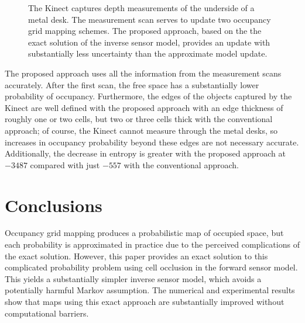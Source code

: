 \documentclass[letterpaper, 10pt, conference]{ieeeconf}
\begin{document}
\begin{figure}[h]
{{	}
	\hspace*{0.1\columnwidth}
}
\caption{The Kinect captures depth measurements of the underside of a metal desk. The measurement scan serves to update two occupancy grid mapping schemes. The proposed approach, based on the the exact solution of the inverse sensor model, provides an update with substantially less uncertainty than the approximate model update.}
\end{figure}


The proposed approach uses all the information from the measurement scans accurately. After the first scan, the free space has a substantially lower probability of occupancy. Furthermore, the edges of the objects captured by the Kinect are well defined with the proposed approach with an edge thickness of roughly one or two cells, but two or three cells thick with the conventional approach; of course, the Kinect cannot measure through the metal desks, so increases in occupancy probability beyond these edges are not necessary accurate.
Additionally, the decrease in entropy is greater with the proposed approach at $-3487$ compared with just $-557$ with the conventional approach.


\section{Conclusions}

Occupancy grid mapping produces a probabilistic map of occupied space, but each probability is approximated in practice due to the perceived complications of the exact solution.
However, this paper provides an exact solution to this complicated probability problem using cell occlusion in the forward sensor model.
This yields a substantially simpler inverse sensor model, which avoids a potentially harmful Markov assumption.
The numerical and experimental results show that maps using this exact approach are substantially improved without computational barriers.
	
\end{document}
